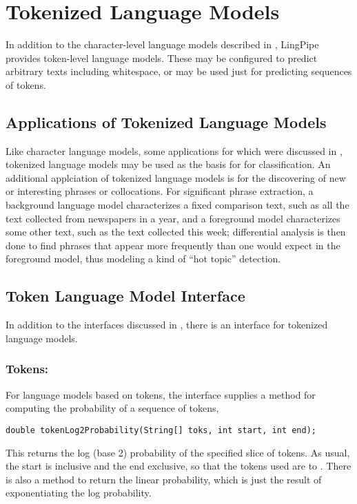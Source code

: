 \chapter{Tokenized Language Models}\label{chap:token-lm}

In addition to the character-level language models described
in , LingPipe provides token-level language
models.  These may be configured to predict arbitrary texts
including whitespace, or may be used just for predicting sequences
of tokens.  

\section{Applications of Tokenized Language Models}

Like character language models, some applications for which were
discussed in , tokenized language models may be
used as the basis for for classification.  An additional applciation
of tokenized language models is for the discovering of new or
interesting phrases or collocations.  For significant phrase
extraction, a background language model characterizes a fixed
comparison text, such as all the text collected from newspapers in a
year, and a foreground model characterizes some other text, such as
the text collected this week; differential analysis is then done to
find phrases that appear more frequently than one would expect in the
foreground model, thus modeling a kind of ``hot topic'' detection.


\section{Token Language Model Interface}

In addition to the interfaces discussed in ,
there is an interface for tokenized language models.

\subsection{Tokens: }

For language models based on tokens, the interface
 supplies a method for
computing the probability of a sequence of tokens,
%
\begin{verbatim}
double tokenLog2Probability(String[] toks, int start, int end);
\end{verbatim}
%
This returns the log (base 2) probability of the specified slice of
tokens.  As usual, the start is inclusive and the end exclusive, so
that the tokens used are  to .
There is also a method to return the linear probability, which is just
the result of exponentiating the log probability.  

